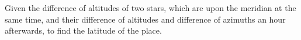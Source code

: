 Given the difference of altitudes of two stars, which are 
upon the meridian at the same time, and their difference
of altitudes and difference of azimuths an hour afterwards,
to find the latitude of the place.
